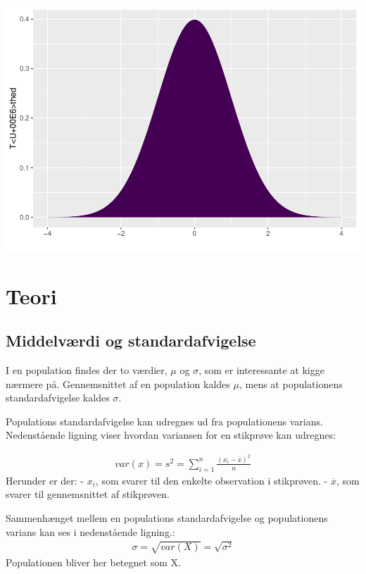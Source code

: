 \documentclass[
]{article}
\begin{document}
\includegraphics{TP2_files/figure-latex/unnamed-chunk-9-1.pdf}

\hypertarget{teori}{%
\section{Teori}\label{teori}}

\hypertarget{middelvuxe6rdi-og-standardafvigelse}{%
\subsection{Middelværdi og
standardafvigelse}\label{middelvuxe6rdi-og-standardafvigelse}}

I en population findes der to værdier, \(\mu\) og \(\sigma\), som er
interessante at kigge nærmere på. Gennemsnittet af en population kaldes
\(\mu\), mens at populationens standardafvigelse kaldes \(\sigma\).

Populations standardafvigelse kan udregnes ud fra populationens varians.
Nedenstående ligning viser hvordan variansen for en stikprøve kan
udregnes:

\[
\begin{aligned}
var(x)=s^2 = \sum_{i=1}^{n} \frac{(x_i-\overline{x})^2}{n}
\end{aligned}
\] Herunder er der: - \(x_i\), som svarer til den enkelte observation i
stikprøven. - \(\overline{x}\), som svarer til gennemsnittet af
stikprøven.

Sammenhænget mellem en populations standardafvigelse og populationens
varians kan ses i nedenstående ligning.: \[
\begin{aligned}
\sigma=\sqrt{var(X)}=\sqrt{\sigma^2}
\end{aligned}
\] Populationen bliver her betegnet som X.
\end{document}
